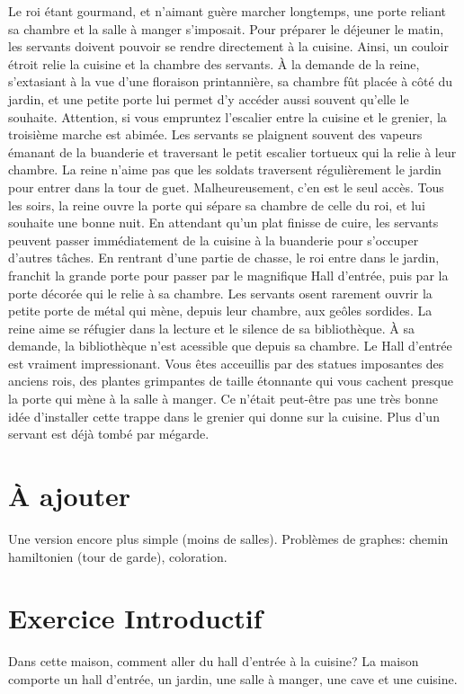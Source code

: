 \documentclass{article}
\begin{document}
Le roi étant gourmand, et n'aimant guère marcher longtemps, une porte reliant sa chambre et la salle à manger s'imposait.
Pour préparer le déjeuner le matin, les servants doivent pouvoir se rendre directement à la cuisine. Ainsi, un couloir étroit relie la cuisine et la chambre des servants.
À la demande de la reine, s'extasiant à la vue d'une floraison printannière, sa chambre fût placée à côté du jardin, et une petite porte lui permet d'y accéder aussi souvent qu'elle le souhaite.
Attention, si vous empruntez l'escalier entre la cuisine et le grenier, la troisième marche est abimée.
Les servants se plaignent souvent des vapeurs émanant de la buanderie et traversant le petit escalier tortueux qui la relie à leur chambre.
La reine n'aime pas que les soldats traversent régulièrement le jardin pour entrer dans la tour de guet. Malheureusement, c'en est le seul accès.
Tous les soirs, la reine ouvre la porte qui sépare sa chambre de celle du roi, et lui souhaite une bonne nuit.
En attendant qu'un plat finisse de cuire, les servants peuvent passer immédiatement de la cuisine à la buanderie pour s'occuper d'autres tâches.
En rentrant d'une partie de chasse, le roi entre dans le jardin, franchit la grande porte pour passer par le magnifique Hall d'entrée, puis par la porte décorée qui le relie à sa chambre.
Les servants osent rarement ouvrir la petite porte de métal qui mène, depuis leur chambre, aux geôles sordides.
La reine aime se réfugier dans la lecture et le silence de sa bibliothèque. À sa demande, la bibliothèque n'est acessible que depuis sa chambre.
Le Hall d'entrée est vraiment impressionant. Vous êtes acceuillis par des statues imposantes des anciens rois, des plantes grimpantes de taille étonnante qui vous cachent presque la porte qui mène à la salle à manger.
Ce n'était peut-être pas une très bonne idée d'installer cette trappe dans le grenier qui donne sur la cuisine. Plus d'un servant est déjà tombé par mégarde.

\section{À ajouter}
Une version encore plus simple (moins de salles).
Problèmes de graphes: chemin hamiltonien (tour de garde), coloration.

\newpage
\section{Exercice Introductif}
Dans cette maison, comment aller du hall d'entrée à la cuisine?
La maison comporte un hall d'entrée, un jardin, une salle à manger, une cave et une cuisine.
\end{document}
